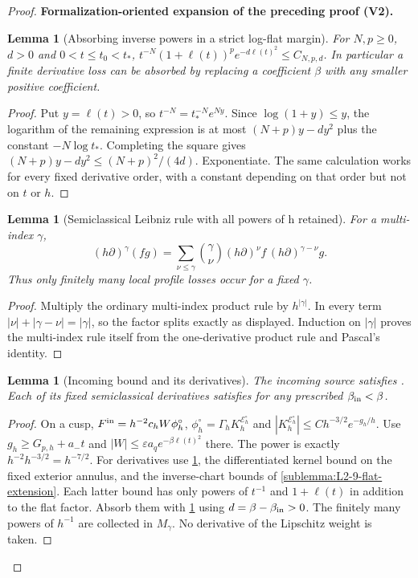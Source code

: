 \documentclass[11pt]{article}
\newtheorem{lemma}[theorem]{Lemma}
\newcommand{\formalisationparentid}{X}
\newenvironment{formalisationaddition}[1]{\par\medskip\begingroup\color{blue}\def\formalisationparentid{#1}\setcounter{formalizationsublemma}{0}\let\lemma\formalizationsublemma\let\endlemma\endformalizationsublemma
  \def\Eo{\mathcal E_h^\circ}\def\EE{\mathcal E_h}\def\phio{\phi_h^\circ}\def\phih{\phi_h}\def\Ho{H_h^{\rm atom}(v^\circ)}\def\Ha{H_h^{\rm atom}}\def\HL{H_h^{L}}\def\Dh{D_h}\def\Log{\operatorname{Log}}\def\ellh{\ell_h}\def\Gp{G_{p,h}}\def\Ast{A_{*,h}}\def\ahat{\widehat{\mathfrak a}_h}\def\ah{\mathfrak a_h}\def\rh{\widehat\rho_h}\def\deltah{\widehat\delta_h}\def\oldref##1{\textup{(##1)}}\def\interface##1{\par\noindent\textit{Analytical interface used here.} ##1\par}\def\finish{\par\noindent\textit{Conclusion of the formalization-oriented expansion.} }\par\noindent\textbf{Formalization-oriented expansion of the preceding proof (V2).}\par\smallskip
}{\par\endgroup\medskip
}
\newcommand{\eps}{\varepsilon}
\begin{document}
\begin{proof}
\begin{formalisationaddition}{T3.4}
\begin{lemma}[Absorbing inverse powers in a strict log-flat margin]\label{sublemma:T3-4-logloss}
For $N,p\ge0$, $d>0$ and $0<t\le t_0<t_*$,
$t^{-N}(1+\ell(t))^p e^{-d\ell(t)^2}\le C_{N,p,d}$.
In particular a finite derivative loss can be absorbed by replacing a
coefficient $\beta$ with any smaller positive coefficient.
\end{lemma}
\begin{proof}
Put $y=\ell(t)>0$, so $t^{-N}=t_*^{-N}e^{Ny}$.
Since $\log(1+y)\le y$, the logarithm of the remaining expression is at
most $(N+p)y-dy^2$ plus the constant $-N\log t_*$.
Completing the square gives
$(N+p)y-dy^2\le(N+p)^2/(4d)$. Exponentiate.
The same calculation works for every fixed derivative order, with a
constant depending on that order but not on $t$ or $h$.
\end{proof}

\begin{lemma}[Semiclassical Leibniz rule with all powers of h retained]\label{sublemma:T3-4-leibniz}
For a multi-index $\gamma$,
\[
 (h\partial)^\gamma(fg)=\sum_{\nu\le\gamma}
  \binom\gamma\nu (h\partial)^\nu f\,
                         (h\partial)^{\gamma-\nu}g.
\]
Thus only finitely many local profile losses occur for a fixed $\gamma$.
\end{lemma}
\begin{proof}
Multiply the ordinary multi-index product rule by $h^{|\gamma|}$.
In every term $|\nu|+|\gamma-\nu|=|\gamma|$, so the factor splits
exactly as displayed. Induction on $|\gamma|$ proves the multi-index
rule itself from the one-derivative product rule and Pascal's identity.
\end{proof}

\begin{lemma}[Incoming bound and its derivatives]\label{sublemma:T3-4-incoming}
The incoming source satisfies . Each of its fixed
semiclassical derivatives satisfies 
for any prescribed $\beta_{\rm in}<\beta$.
\end{lemma}
\begin{proof}
On a cusp, $F^{\rm in}=h^{-2}c_hW\phio$,
$\phio=\Gamma_hK_h^{\Eo}$ and
$|K_h^{\Eo}|\le Ch^{-3/2}e^{-g_h/h}$.
Use $g_h\ge G_{p,h}+a_-t$ and
$|W|\le\eps a_qe^{-\beta\ell(t)^2}$ there. The power is exactly
$h^{-2}h^{-3/2}=h^{-7/2}$.
For derivatives use \ref{sublemma:T3-4-leibniz}, the differentiated
kernel bound on the fixed exterior annulus, and the inverse-chart
bounds of \ref{sublemma:L2-9-flat-extension}. Each latter bound has
only powers of $t^{-1}$ and $1+\ell(t)$ in addition to the flat factor.
Absorb them with \ref{sublemma:T3-4-logloss} using
$d=\beta-\beta_{\rm in}>0$. The finitely many powers of $h^{-1}$ are
collected in $M_\gamma$. No derivative of the Lipschitz weight is taken.
\end{proof}


\end{formalisationaddition}
\end{proof}
\end{document}
